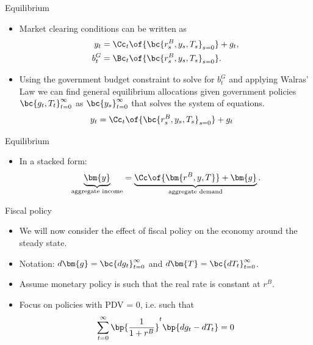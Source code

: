 \documentclass[11pt,xcolor={dvipsnames},aspectratio=159,hyperref={pdftex,pdfpagemode=UseNone,hidelinks,pdfdisplaydoctitle=true},usepdftitle=false]{beamer}
\begin{document}
\begin{frame}{Equilibrium}
 \begin{itemize} 
    \item Market clearing conditions can be written as 
    \begin{align*}
        y_t & = \Cc_t\of{\bc{r^B_s,y_s,T_s}_{s=0}} + g_t, \\
        b^G_t & = \Bc_t\of{\bc{r^B_s,y_s,T_s}_{s=0}}.
        \end{align*} 
        \item Using the government budget constraint to solve for $b^G_t$ and applying Walras' Law we can find general equilibrium allocations given government policies $\bc{g_t,T_t}_{t=0}^\infty$ as $\bc{y_s}_{t=0}^\infty$ that solves the system of equations.
        \begin{align*}
            y_t & = \Cc_t\of{\bc{r^B_s,y_s,T_s}_{s=0}} + g_t
        \end{align*}
 \end{itemize}
\end{frame}

\begin{frame}{Equilibrium}
    \begin{itemize} 
       \item In a stacked form:
       \begin{align*}
        \underbrace{\bm{y}}_{\text{aggregate income}} = \underbrace{\Cc\of{\bm{r^B,y,T}} + \bm{g}}_{\text{aggregate demand}}.
           \end{align*}
    \end{itemize}
   \end{frame}    


   \begin{frame}{Fiscal policy}
    \begin{itemize}
    \item We will now consider the effect of fiscal policy on the economy around the steady state.
    \item Notation: $d\bm{g}=\bc{dg_t}_{t=0}^\infty$ and $d\bm{T}=\bc{dT_t}_{t=0}^\infty$.
    \item Assume monetary policy is such that the real rate is constant at $r^B$.
    \item Focus on policies with PDV = 0, i.e. such that \begin{align*}
        \sum_{t=0}^\infty \bp{\frac{1}{1+r^B}}^t \bp{dg_t - dT_t} = 0 \end{align*}
    \end{itemize}
   \end{frame}
\end{document}
